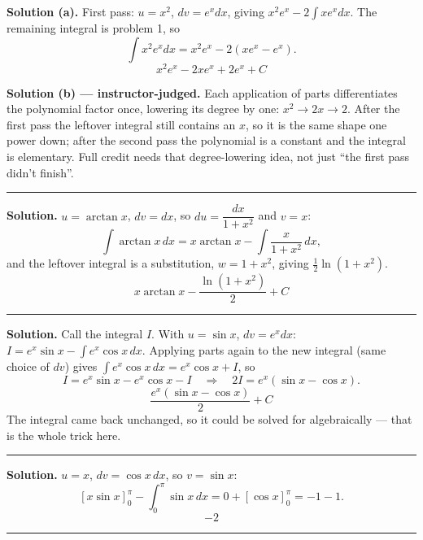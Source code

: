 \documentclass[12pt]{article}
\begin{document}
\textbf{Solution (a).} First pass: $u = x^2$, $dv = e^x dx$, giving
$x^2e^x - 2\int xe^x dx$. The remaining integral is problem 1, so
\[ \int x^2 e^x dx = x^2e^x - 2\left(xe^x - e^x\right). \]
\[ \boxed{x^{2}e^{x} - 2xe^{x} + 2e^{x} + C} \]

\textbf{Solution (b) --- instructor-judged.} Each application of parts
differentiates the polynomial factor once, lowering its degree by one:
$x^2 \rightarrow 2x \rightarrow 2$. After the first pass the leftover integral
still contains an $x$, so it is the same shape one power down; after the second
pass the polynomial is a constant and the integral is elementary. Full credit
needs that degree-lowering idea, not just ``the first pass didn't finish''.

\vspace{0.15cm}\noindent\rule{\linewidth}{0.2pt}


\textbf{Solution.} $u = \arctan x$, $dv = dx$, so
$du = \dfrac{dx}{1 + x^2}$ and $v = x$:
\[ \int \arctan x\,dx = x\arctan x - \int\frac{x}{1 + x^2}\,dx , \]
and the leftover integral is a substitution, $w = 1 + x^2$, giving
$\tfrac{1}{2}\ln\!\left(1 + x^2\right)$.
\[ \boxed{x\arctan x - \frac{\ln\!\left(1 + x^{2}\right)}{2} + C} \]

\vspace{0.15cm}\noindent\rule{\linewidth}{0.2pt}


\textbf{Solution.} Call the integral $I$. With $u = \sin x$, $dv = e^x dx$:
$I = e^x\sin x - \int e^x\cos x\,dx$. Applying parts again to the new integral
(same choice of $dv$) gives $\int e^x\cos x\,dx = e^x\cos x + I$, so
\[ I = e^x\sin x - e^x\cos x - I \quad\Longrightarrow\quad 2I = e^x(\sin x - \cos x). \]
\[ \boxed{\frac{e^{x}\left(\sin x - \cos x\right)}{2} + C} \]
The integral came back unchanged, so it could be solved for algebraically ---
that is the whole trick here.

\vspace{0.15cm}\noindent\rule{\linewidth}{0.2pt}


\textbf{Solution.} $u = x$, $dv = \cos x\,dx$, so $v = \sin x$:
\[ \left[x\sin x\right]_0^{\pi} - \int_0^{\pi}\sin x\,dx
   = 0 + \left[\cos x\right]_0^{\pi} = -1 - 1 . \]
\[ \boxed{-2} \]

\vspace{0.15cm}\noindent\rule{\linewidth}{0.2pt}
\end{document}
